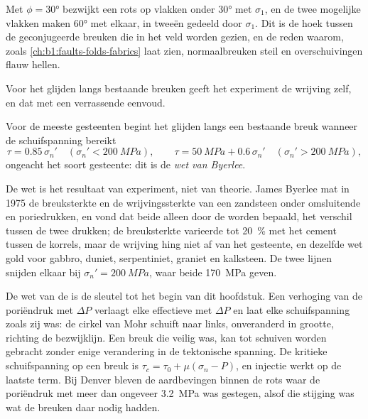 Met $\phi = \ang{30}$ bezwijkt een rots op vlakken onder \ang{30} met $\sigma_1$, en de twee mogelijke vlakken maken \ang{60} met elkaar, in tweeën gedeeld door $\sigma_1$. Dit is de hoek tussen de geconjugeerde breuken die in het veld worden gezien, en de reden waarom, zoals \cref{ch:b1:faults-folds-fabrics} laat zien, normaalbreuken steil en overschuivingen flauw hellen.

Voor het glijden langs bestaande breuken geeft het experiment de wrijving zelf, en dat met een verrassende eenvoud.

\begin{proposition}\label{prop:b1:stress-strain-rheology:byerlee}
Voor de meeste gesteenten begint het glijden langs een bestaande breuk wanneer de schuifspanning bereikt
\[
  \tau = 0.85\,\sigma_n' \quad (\sigma_n' < \qty{200}{MPa}), \qquad
  \tau = \qty{50}{MPa} + 0.6\,\sigma_n' \quad (\sigma_n' > \qty{200}{MPa}),
\]
ongeacht het soort gesteente: dit is de \emph{wet van Byerlee}.
\end{proposition}
\admitted

De wet is het resultaat van experiment, niet van theorie. James Byerlee mat in 1975 de breuksterkte en de wrijvingssterkte van een zandsteen onder omsluitende en poriedrukken, en vond dat beide alleen door de  worden bepaald, het verschil tussen de twee drukken; de breuksterkte varieerde tot \qty{20}{\percent} met het cement tussen de korrels, maar de wrijving hing niet af van het gesteente, en dezelfde wet gold voor gabbro, duniet, serpentiniet, graniet en kalksteen. De twee lijnen snijden elkaar bij $\sigma_n' = \qty{200}{MPa}$, waar beide \qty{170}{MPa} geven.

De wet van de  is de sleutel tot het begin van dit hoofdstuk. Een verhoging van de poriëndruk met $\Delta P$ verlaagt elke effectieve  met $\Delta P$ en laat elke schuifspanning zoals zij was: de cirkel van Mohr schuift naar links, onveranderd in grootte, richting de bezwijklijn. Een breuk die veilig was, kan tot schuiven worden gebracht zonder enige verandering in de tektonische spanning. De kritieke schuifspanning op een breuk is $\tau_c = \tau_0 + \mu(\sigma_n - P)$, en injectie werkt op de laatste term. Bij Denver bleven de aardbevingen binnen de rots waar de poriëndruk met meer dan ongeveer \qty{3.2}{MPa} was gestegen, alsof die stijging was wat de breuken daar nodig hadden.

